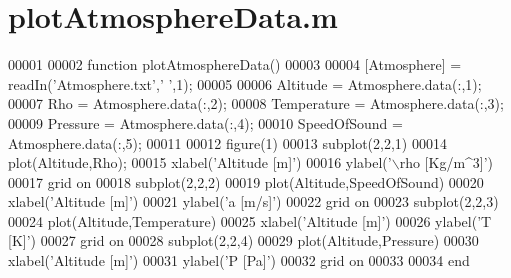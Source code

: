 \hypertarget{plot_atmosphere_data_8m_source}{}\section{plot\+Atmosphere\+Data.\+m}
\label{plot_atmosphere_data_8m_source}

\begin{DoxyCode}
00001 
00002 \textcolor{keyword}{function} plotAtmosphereData()
00003 
00004 [Atmosphere] = readIn(\textcolor{stringliteral}{'Atmosphere.txt'},\textcolor{charliteral}{' '},1);
00005 
00006 Altitude = Atmosphere.data(:,1);
00007 Rho = Atmosphere.data(:,2);
00008 Temperature =  Atmosphere.data(:,3);
00009 Pressure =  Atmosphere.data(:,4);
00010 SpeedOfSound =  Atmosphere.data(:,5);
00011 
00012 figure(1)
00013 subplot(2,2,1)
00014 plot(Altitude,Rho);
00015 xlabel('Altitude [m]')
00016 ylabel('\(\backslash\)rho [Kg/m^3]')
00017 grid on
00018 subplot(2,2,2)
00019 plot(Altitude,SpeedOfSound)
00020 xlabel('Altitude [m]')
00021 ylabel('a [m/s]')
00022 grid on
00023 subplot(2,2,3)
00024 plot(Altitude,Temperature)
00025 xlabel('Altitude [m]')
00026 ylabel('T [K]')
00027 grid on
00028 subplot(2,2,4)
00029 plot(Altitude,Pressure)
00030 xlabel('Altitude [m]')
00031 ylabel('P [Pa]')
00032 grid on
00033 
00034 end
\end{DoxyCode}
